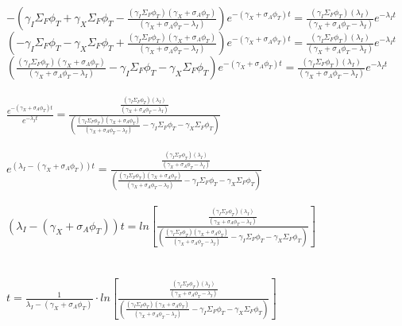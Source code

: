 \documentclass[11pt,a4paper]{article}
\begin{document}
\noindent $-(\gamma_I\Sigma_F\phi_T+\gamma_X\Sigma_F\phi_T-\frac{(\gamma_I\Sigma_F\phi_T)(\gamma_X+\sigma_A\phi_T)}{(\gamma_X+\sigma_A\phi_T-\lambda_I)})e^{-(\gamma_X+\sigma_A\phi_T)t}=\frac{(\gamma_I\Sigma_F\phi_T)(\lambda_I)}{(\gamma_X+\sigma_A\phi_T-\lambda_I)}e^{-\lambda_I t}$ \\

\noindent $(-\gamma_I\Sigma_F\phi_T-\gamma_X\Sigma_F\phi_T+\frac{(\gamma_I\Sigma_F\phi_T)(\gamma_X+\sigma_A\phi_T)}{(\gamma_X+\sigma_A\phi_T-\lambda_I)})e^{-(\gamma_X+\sigma_A\phi_T)t}=\frac{(\gamma_I\Sigma_F\phi_T)(\lambda_I)}{(\gamma_X+\sigma_A\phi_T-\lambda_I)}e^{-\lambda_I t}$ \\

\noindent $(\frac{(\gamma_I\Sigma_F\phi_T)(\gamma_X+\sigma_A\phi_T)}{(\gamma_X+\sigma_A\phi_T-\lambda_I)}-\gamma_I\Sigma_F\phi_T-\gamma_X\Sigma_F\phi_T)e^{-(\gamma_X+\sigma_A\phi_T)t}=\frac{(\gamma_I\Sigma_F\phi_T)(\lambda_I)}{(\gamma_X+\sigma_A\phi_T-\lambda_I)}e^{-\lambda_I t}$ \\ \\

\noindent $\frac{e^{-(\gamma_X+\sigma_A\phi_T)t}}{e^{-\lambda_I t}}=\frac{\frac{(\gamma_I\Sigma_F\phi_T)(\lambda_I)}{(\gamma_X+\sigma_A\phi_T-\lambda_I)}}{(\frac{(\gamma_I\Sigma_F\phi_T)(\gamma_X+\sigma_A\phi_T)}{(\gamma_X+\sigma_A\phi_T-\lambda_I)}-\gamma_I\Sigma_F\phi_T-\gamma_X\Sigma_F\phi_T)}$ \\ \\

\noindent $e^{(\lambda_I-(\gamma_X+\sigma_A\phi_T))t}=\frac{\frac{(\gamma_I\Sigma_F\phi_T)(\lambda_I)}{(\gamma_X+\sigma_A\phi_T-\lambda_I)}}{(\frac{(\gamma_I\Sigma_F\phi_T)(\gamma_X+\sigma_A\phi_T)}{(\gamma_X+\sigma_A\phi_T-\lambda_I)}-\gamma_I\Sigma_F\phi_T-\gamma_X\Sigma_F\phi_T)}$ \\ \\

\noindent $(\lambda_I-(\gamma_X+\sigma_A\phi_T))t=ln[\frac{\frac{(\gamma_I\Sigma_F\phi_T)(\lambda_I)}{(\gamma_X+\sigma_A\phi_T-\lambda_I)}}{(\frac{(\gamma_I\Sigma_F\phi_T)(\gamma_X+\sigma_A\phi_T)}{(\gamma_X+\sigma_A\phi_T-\lambda_I)}-\gamma_I\Sigma_F\phi_T-\gamma_X\Sigma_F\phi_T)}]$ \\ \\ \\

\noindent $t=\frac{1}{\lambda_I-(\gamma_X+\sigma_A\phi_T)}\cdot  ln[\frac{\frac{(\gamma_I\Sigma_F\phi_T)(\lambda_I)}{(\gamma_X+\sigma_A\phi_T-\lambda_I)}}{(\frac{(\gamma_I\Sigma_F\phi_T)(\gamma_X+\sigma_A\phi_T)}{(\gamma_X+\sigma_A\phi_T-\lambda_I)}-\gamma_I\Sigma_F\phi_T-\gamma_X\Sigma_F\phi_T)}]$
\end{document}
